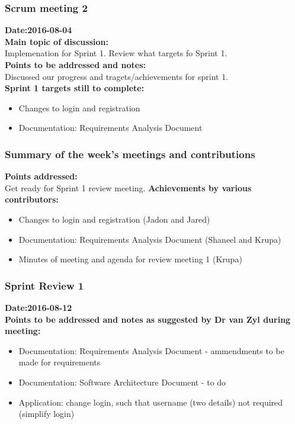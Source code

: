 \documentclass[12pt]{article}
\begin{document}
{\subsubsection{Scrum meeting 2}
\textbf{Date:2016-08-04}\\
\textbf{Main topic of discussion:}\\
Implemenation for Sprint 1. Review what targets fo Sprint 1.\\
\textbf{Points to be addressed and notes:}\\
Discussed our progress and tragets/achievements for sprint 1.\\
\textbf{Sprint 1 targets still to complete:} \\
\begin{itemize}
\item Changes to login and registration
\item Documentation: Requirements Analysis Document
\end{itemize}
\subsubsection{Summary of the week's meetings and contributions}
\textbf{Points addressed:} \\
Get ready for Sprint 1 review meeting.
\textbf{Achievements by various contributors:}
\begin{itemize}
\item Changes to login and registration (Jadon and Jared)
\item Documentation: Requirements Analysis Document (Shaneel and Krupa)
\item Minutes of meeting and agenda for review meeting 1 (Krupa)
\end{itemize}

\subsubsection{Sprint Review 1}
\textbf{Date:2016-08-12}\\
\textbf{Points to be addressed and notes as suggested by Dr van Zyl during meeting:}\\
\begin{itemize}
\item Documentation: Requirements Analysis Document - ammendments to be made for requirements
\item Documentation: Software Architecture Document - to do
\item Application: change login, such that username (two details) not required (simplify login)
\end{itemize} 


}
\end{document}
